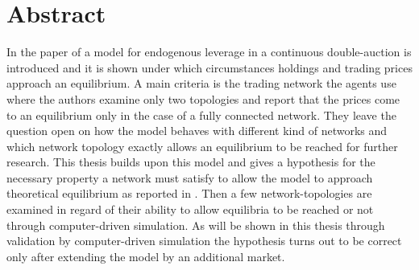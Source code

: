 \documentclass[Bachelorarbeit.tex]{subfiles}
\begin{document}
\chapter*{Abstract}
In the paper of \cite{Breuer2015} a model for endogenous leverage in a continuous double-auction is introduced and it is shown under which circumstances holdings and trading prices approach an equilibrium. A main criteria is the trading network the agents use where the authors examine only two topologies and report that the prices come to an equilibrium only in the case of a fully connected network. They leave the question open on how the model behaves with different kind of networks and which network topology exactly allows an equilibrium to be reached  for further research. This thesis builds upon this model and gives a hypothesis for the necessary property a network must satisfy to allow the model to approach theoretical equilibrium as reported in \cite{Breuer2015}. Then a few network-topologies are examined in regard of their ability to allow equilibria to be reached or not through computer-driven simulation. As will be shown in this thesis through validation by computer-driven simulation the hypothesis turns out to be correct only after extending the model by an additional market.
\end{document}
